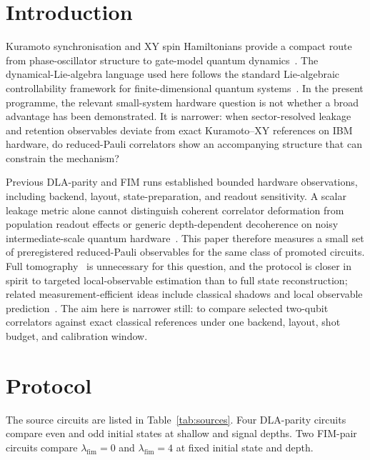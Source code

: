 \documentclass[preprint,aps,physrev,superscriptaddress,floatfix,longbibliography]{revtex4-2}
\begin{document}
\maketitle

\section{Introduction}

Kuramoto synchronisation and XY spin Hamiltonians provide a compact route from
phase-oscillator structure to gate-model quantum
dynamics~\cite{Kuramoto1975,Acebron2005}. The dynamical-Lie-algebra language
used here follows the standard Lie-algebraic controllability framework for
finite-dimensional quantum systems~\cite{DAlessandro2007}.
In the present programme, the relevant small-system hardware question is not
whether a broad advantage has been demonstrated. It is narrower: when
sector-resolved leakage and retention observables deviate from exact
Kuramoto--XY references on IBM hardware, do reduced-Pauli correlators show an
accompanying structure that can constrain the mechanism?

Previous DLA-parity and FIM runs established bounded hardware observations,
including backend, layout, state-preparation, and readout sensitivity. A scalar
leakage metric alone cannot distinguish coherent correlator deformation from
population readout effects or generic depth-dependent decoherence on noisy
intermediate-scale quantum hardware~\cite{Preskill2018}. This paper therefore
measures a small set of preregistered reduced-Pauli observables for the same
class of promoted circuits. Full tomography~\cite{NielsenChuang2010} is
unnecessary for this question, and the protocol is closer in spirit to
targeted local-observable estimation than to full state reconstruction; related
measurement-efficient ideas include classical shadows and local observable
prediction~\cite{HuangKuengPreskill2020}. The aim here is narrower still: to
compare selected two-qubit correlators against exact classical references
under one backend, layout, shot budget, and calibration window.

\section{Protocol}

The source circuits are listed in Table~\ref{tab:sources}. Four DLA-parity
circuits compare even and odd initial states at shallow and signal depths. Two
FIM-pair circuits compare $\lambda_{\mathrm{fim}}=0$ and
$\lambda_{\mathrm{fim}}=4$ at fixed initial state and depth.
\end{document}
